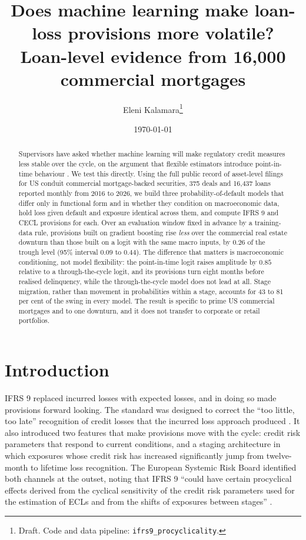 \documentclass[11pt]{article}
\title{Does machine learning make loan-loss provisions more volatile?\\
\large Loan-level evidence from 16,000 commercial mortgages}
\author{Eleni Kalamara\thanks{Draft. Code and data pipeline: \texttt{ifrs9\_procyclicality}.}}
\date{\today}
\begin{document}
\maketitle

\begin{abstract}
Supervisors have asked whether machine learning will make regulatory credit measures less stable over the cycle,
on the argument that flexible estimators introduce point-in-time behaviour \citep{eba2021ml}. We test this directly. Using the full public record
of asset-level filings for US conduit commercial mortgage-backed securities, 375 deals and 16{,}437 loans reported
monthly from 2016 to 2026, we build three probability-of-default models that differ only in functional form and in
whether they condition on macroeconomic data, hold loss given default and exposure identical across them, and
compute IFRS 9 and CECL provisions for each. Over an evaluation window fixed in advance by a training-data rule,
provisions built on gradient boosting rise \emph{less} over the commercial real estate downturn than those built
on a logit with the same macro inputs, by $0.26$ of the trough level (95\% interval $0.09$ to $0.44$). The
difference that matters is macroeconomic conditioning, not model flexibility: the point-in-time logit raises
amplitude by $0.85$ relative to a through-the-cycle logit, and its provisions turn eight months before realised
delinquency, while the through-the-cycle model does not lead at all. Stage migration, rather than movement in
probabilities within a stage, accounts for 43 to 81 per cent of the swing in every model. The result is specific
to prime US commercial mortgages and to one downturn, and it does not transfer to corporate or retail portfolios.
\end{abstract}

\section{Introduction}
\label{sec:intro}
IFRS 9 replaced incurred losses with expected losses, and in doing so made provisions forward looking. The
standard was designed to correct the ``too little, too late'' recognition of credit losses that the incurred loss
approach produced \citep{esrb2017ifrs9}. It also introduced two features that make provisions move with the cycle:
credit risk parameters that respond to current conditions, and a staging architecture in which exposures whose
credit risk has increased significantly jump from twelve-month to lifetime loss recognition. The European Systemic
Risk Board identified both channels at the outset, noting that IFRS 9 ``could have certain procyclical effects
derived from the cyclical sensitivity of the credit risk parameters used for the estimation of ECLs and from the
shifts of exposures between stages'' \citep{esrb2017ifrs9}.
\end{document}
